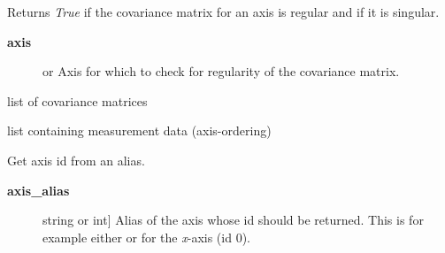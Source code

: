 \documentclass[a4paper,10pt,english]{sphinxmanual}
\begin{document}
\begin{fulllineitems}
\begin{fulllineitems}
\end{fulllineitems}


\begin{fulllineitems}
\label{index:kafe.dataset.Dataset.cov_mat_is_regular}
Returns \emph{True} if the covariance matrix for an axis is regular and  if it is
singular.
\begin{description}
\item[{\textbf{axis}}] \leavevmode{[} or \code{'y'}{]}
Axis for which to check for regularity of the covariance matrix.

\end{description}

\end{fulllineitems}


\begin{fulllineitems}
\label{index:kafe.dataset.Dataset.cov_mats}
list of covariance matrices

\end{fulllineitems}


\begin{fulllineitems}
\label{index:kafe.dataset.Dataset.data}
list containing measurement data (axis-ordering)

\end{fulllineitems}


\begin{fulllineitems}
\label{index:kafe.dataset.Dataset.get_axis}
Get axis id from an alias.
\begin{description}
\item[{\textbf{axis\_alias}}] \leavevmode{[}string or int{]}
Alias of the axis whose id should be returned. This is for example either  or  for the \emph{x}-axis (id 0).

\end{description}

\end{fulllineitems}


\end{fulllineitems}
\end{document}
